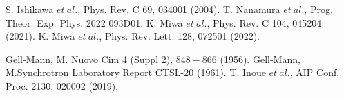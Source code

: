 %

\begin{thebibliography}{99}
%
S. Ishikawa $et\ al.$, Phys. Rev. C 69, 034001 (2004).
T. Nanamura $et\ al.$, Prog. Theor. Exp. Phys. 2022 093D01.
K. Miwa $et\ al.$, Phys. Rev. C 104, 045204 (2021).
K. Miwa $et\ al.$, Phys. Rev. Lett. 128, 072501 (2022).

Gell-Mann, M. Nuovo Cim 4 (Suppl 2), $848-866$ (1956).
Gell-Mann, M.Synchrotron Laboratory Report CTSL-20 (1961).
T. Inoue $et\ al.$, AIP Conf. Proc. 2130, 020002 (2019).


\end{thebibliography}
